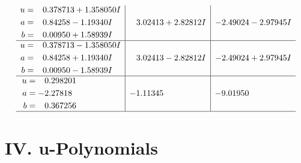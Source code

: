 \documentclass[1p]{elsarticle_modified}
\theoremstyle{definition}
\begin{document}
$$\begin{array}{c|c|c}
\begin{aligned}
u &= \phantom{-}0.378713 + 1.358050 I \\
a &= \phantom{-}0.84258 - 1.19340 I \\
b &= \phantom{-}0.00950 + 1.58939 I\end{aligned}
 & \phantom{-}3.02413 + 2.82812 I & -2.49024 - 2.97945 I \\ \hline\begin{aligned}
u &= \phantom{-}0.378713 - 1.358050 I \\
a &= \phantom{-}0.84258 + 1.19340 I \\
b &= \phantom{-}0.00950 - 1.58939 I\end{aligned}
 & \phantom{-}3.02413 - 2.82812 I & -2.49024 + 2.97945 I \\ \hline\begin{aligned}
u &= \phantom{-}0.298201\phantom{ +0.000000I} \\
a &= -2.27818\phantom{ +0.000000I} \\
b &= \phantom{-}0.367256\phantom{ +0.000000I}\end{aligned}
 & -1.11345\phantom{ +0.000000I} & -9.01950\phantom{ +0.000000I}\\
 \hline 
 \end{array}$$\newpage
\newpage\renewcommand{\arraystretch}{1}
\centering \section*{ IV. u-Polynomials}
\end{document}
